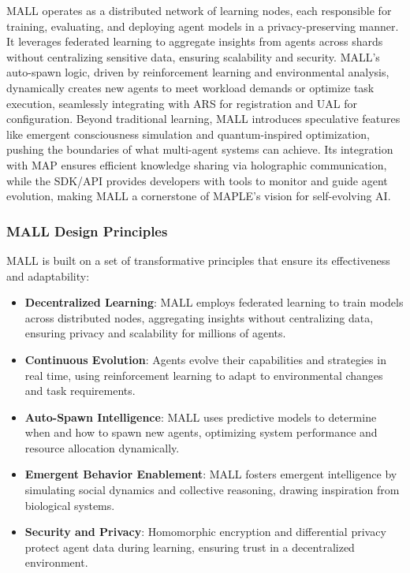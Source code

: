 \documentclass[a4paper,11pt]{article}
\begin{document}
MALL operates as a distributed network of learning nodes, each responsible for training, evaluating, and deploying agent models in a privacy-preserving manner. It leverages federated learning to aggregate insights from agents across shards without centralizing sensitive data, ensuring scalability and security. MALL’s auto-spawn logic, driven by reinforcement learning and environmental analysis, dynamically creates new agents to meet workload demands or optimize task execution, seamlessly integrating with ARS for registration and UAL for configuration. Beyond traditional learning, MALL introduces speculative features like emergent consciousness simulation and quantum-inspired optimization, pushing the boundaries of what multi-agent systems can achieve. Its integration with MAP ensures efficient knowledge sharing via holographic communication, while the SDK/API provides developers with tools to monitor and guide agent evolution, making MALL a cornerstone of MAPLE’s vision for self-evolving AI.

\subsubsection{MALL Design Principles}
MALL is built on a set of transformative principles that ensure its effectiveness and adaptability:
\begin{itemize}[leftmargin=*]
    \item \textbf{Decentralized Learning}: MALL employs federated learning to train models across distributed nodes, aggregating insights without centralizing data, ensuring privacy and scalability for millions of agents.
    \item \textbf{Continuous Evolution}: Agents evolve their capabilities and strategies in real time, using reinforcement learning to adapt to environmental changes and task requirements.
    \item \textbf{Auto-Spawn Intelligence}: MALL uses predictive models to determine when and how to spawn new agents, optimizing system performance and resource allocation dynamically.
    \item \textbf{Emergent Behavior Enablement}: MALL fosters emergent intelligence by simulating social dynamics and collective reasoning, drawing inspiration from biological systems.
    \item \textbf{Security and Privacy}: Homomorphic encryption and differential privacy protect agent data during learning, ensuring trust in a decentralized environment.
\end{itemize}
\end{document}
